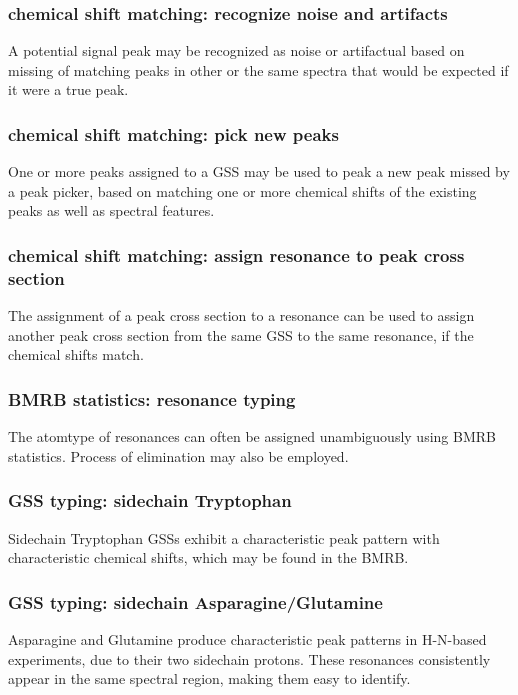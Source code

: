 \subsubsection{chemical shift matching: recognize noise and artifacts}
A potential signal peak may be recognized as noise or artifactual based on
missing of matching peaks in other or the same spectra that would be expected
if it were a true peak.

\subsubsection{chemical shift matching: pick new peaks}
One or more peaks assigned to a GSS may be used to peak a new peak missed by a
peak picker, based on matching one or more chemical shifts of the existing peaks
as well as spectral features.

\subsubsection{chemical shift matching: assign resonance to peak cross section}
The assignment of a peak cross section to a resonance can be used to assign another
peak cross section from the same GSS to the same resonance, if the chemical shifts
match.

\subsubsection{BMRB statistics: resonance typing}
The atomtype of resonances can often be assigned unambiguously using BMRB
statistics.  Process of elimination may also be employed.

\subsubsection{GSS typing: sidechain Tryptophan}
Sidechain Tryptophan GSSs exhibit a characteristic peak pattern with 
characteristic chemical shifts, which may be found in the BMRB.

\subsubsection{GSS typing: sidechain Asparagine/Glutamine}
Asparagine and Glutamine produce characteristic peak patterns in H-N-based 
experiments, due to their two sidechain protons.  These resonances consistently
appear in the same spectral region, making them easy to identify.


